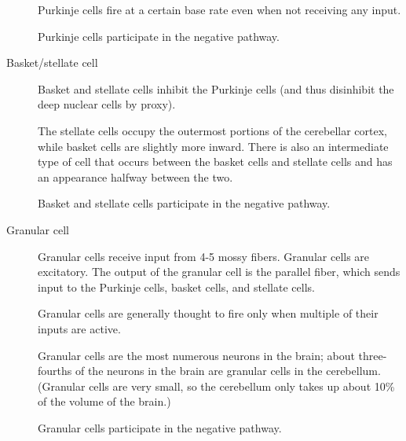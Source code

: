 \documentclass{article}
\theoremstyle{definition}
\begin{document}
\begin{description}
  Purkinje cells fire at a certain base rate even when not receiving
  any input.

  Purkinje cells participate in the negative pathway.

\item[Basket/stellate cell] Basket and stellate cells inhibit the
  Purkinje cells (and thus disinhibit the deep nuclear cells by
  proxy).

  The stellate cells occupy the outermost portions of the cerebellar
  cortex, while basket cells are slightly more inward. There is also
  an intermediate type of cell that occurs between the basket cells
  and stellate cells and has an appearance halfway between the two.

  Basket and stellate cells participate in the negative pathway.

\item[Granular cell] Granular cells receive input from 4-5 mossy
  fibers. Granular cells are excitatory. The output of the granular
  cell is the parallel fiber, which sends input to the Purkinje cells,
  basket cells, and stellate cells.

  Granular cells are generally thought to fire only when multiple of
  their inputs are active.

  Granular cells are the most numerous neurons in the brain; about
  three-fourths of the neurons in the brain are granular cells in the
  cerebellum. (Granular cells are very small, so the cerebellum only
  takes up about 10\% of the volume of the brain.)

  Granular cells participate in the negative pathway.
\end{description}
\end{document}
